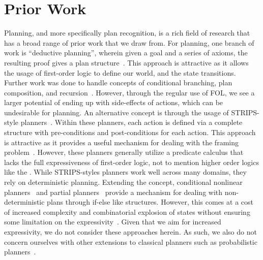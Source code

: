 \section{Prior Work}

Planning, and more specifically plan recognition, is a rich field of
research that has a broad range of prior work that we draw from. For planning,
one branch of work is ``deductive planning'', wherein given a goal and a series 
of axioms,
the resulting proof gives a plan structure~\cite{green_application_1969}. This
approach is attractive as it allows the usage of first-order logic to define
our world, and the state transitions. Further work was done to handle concepts
of conditional branching, plan composition, and 
recursion~\cite{metzing_plan_1989,biundo_deductive_1992,rosenschein_plan_1981}.
However, through the regular use of FOL, we see a larger potential of ending
up with side-effects of actions, which can be undesirable for planning. An
alternative concept is through the usage of STRIPS-style 
planners~\cite{fikes_strips_1971}. Within these planners, each action is
defined via a complete structure with pre-conditions and post-conditions for
each action. This approach is attractive as it provides a useful mechanism for
dealing with the framing problem~\cite{mccarthy_philosophical_1969}. However,
these planners generally utilize a predicate calculus that lacks the full
expressiveness of first-order logic, not to mention higher order logics like
the \CEC. While STRIPS-styles planners work well across many domains, they
rely on deterministic planning. Extending the concept, conditional nonlinear
planners~\cite{peot_conditional_1992} and partial 
planners~\cite{pryor_planning_1996}
provide a mechanism for dealing with non-deterministic plans through if-else
like structures. However, this comes at a cost of increased complexity and
combinatorial explosion of states without ensuring some limitation on the
expressivity~\cite{rintanen_constructing_1999}. Given that we aim for increased 
expressivity, we do not consider these approaches herein. As such, we also do
not concern ourselves with other extensions to classical planners such as 
probabilistic 
planners~\cite{boutilier_decision-theoretic_1999,kaelbling_planning_1998}.

